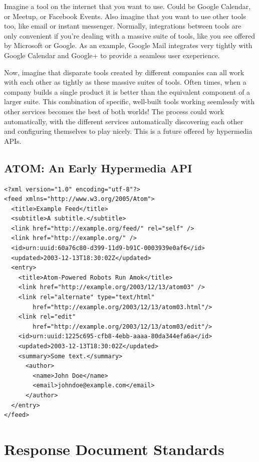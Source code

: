 \documentclass{book}
\begin{document}
Imagine a tool on the internet that you want to use. Could be Google Calendar, or Meetup, or Facebook Events. Also imagine that you want to use other tools too, like email or instant messenger. Normally, integrations between tools are only convenient if you're dealing with a massive suite of tools, like you see offered by Microsoft or Google. As an example, Google Mail integrates very tightly with Google Calendar and Google+ to provide a seamless user exeperience.

Now, imagine that disparate tools created by different companies can all work with each other as tightly as these massive suites of tools. Often times, when a company builds a single product it is better than the equivalent component of a larger suite. This combination of specific, well-built tools working seemlessly with other services becomes the best of both worlds! The process could work automatically, with the different services automatically discovering each other and configuring themselves to play nicely. This is a future offered by hypermedia APIs.

\subsection{ATOM: An Early Hypermedia API}

\begin{verbatim}
<?xml version="1.0" encoding="utf-8"?>
<feed xmlns="http://www.w3.org/2005/Atom">
  <title>Example Feed</title>
  <subtitle>A subtitle.</subtitle>
  <link href="http://example.org/feed/" rel="self" />
  <link href="http://example.org/" />
  <id>urn:uuid:60a76c80-d399-11d9-b91C-0003939e0af6</id>
  <updated>2003-12-13T18:30:02Z</updated>
  <entry>
    <title>Atom-Powered Robots Run Amok</title>
    <link href="http://example.org/2003/12/13/atom03" />
    <link rel="alternate" type="text/html"
        href="http://example.org/2003/12/13/atom03.html"/>
    <link rel="edit"
        href="http://example.org/2003/12/13/atom03/edit"/>
    <id>urn:uuid:1225c695-cfb8-4ebb-aaaa-80da344efa6a</id>
    <updated>2003-12-13T18:30:02Z</updated>
    <summary>Some text.</summary>
      <author>
        <name>John Doe</name>
        <email>johndoe@example.com</email>
      </author>
  </entry>
</feed>
\end{verbatim}


\section{Response Document Standards}
\end{document}
